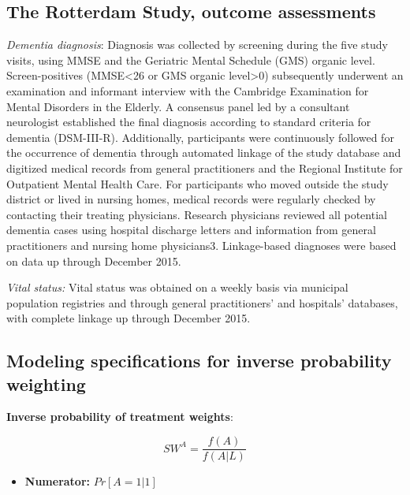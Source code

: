 \documentclass[
]{book}
\providecommand{\tightlist}{%
  \setlength{\itemsep}{0pt}\setlength{\parskip}{0pt}}
\begin{document}
\hypertarget{the-rotterdam-study-outcome-assessments}{%
\subsection{The Rotterdam Study, outcome assessments}\label{the-rotterdam-study-outcome-assessments}}

\emph{Dementia diagnosis}: Diagnosis was collected by screening during the five study visits, using MMSE and the Geriatric Mental Schedule (GMS) organic level. Screen-positives (MMSE\textless26 or GMS organic level\textgreater0) subsequently underwent an examination and informant interview with the Cambridge Examination for Mental Disorders in the Elderly. A consensus panel led by a consultant neurologist established the final diagnosis according to standard criteria for dementia (DSM-III-R). Additionally, participants were continuously followed for the occurrence of dementia through automated linkage of the study database and digitized medical records from general practitioners and the Regional Institute for Outpatient Mental Health Care. For participants who moved outside the study district or lived in nursing homes, medical records were regularly checked by contacting their treating physicians. Research physicians reviewed all potential dementia cases using hospital discharge letters and information from general practitioners and nursing home physicians3. Linkage-based diagnoses were based on data up through December 2015.

\emph{Vital status:} Vital status was obtained on a weekly basis via municipal population registries and through general practitioners' and hospitals' databases, with complete linkage up through December 2015.

\hypertarget{modeling-specifications-for-inverse-probability-weighting}{%
\subsection{Modeling specifications for inverse probability weighting}\label{modeling-specifications-for-inverse-probability-weighting}}

\textbf{Inverse probability of treatment weights}:

\[SW^A = \frac{f(A)}{f(A|L)}\]

\begin{itemize}
\tightlist
\item
  \textbf{Numerator:} \(Pr[A = 1|1]\)
\end{itemize}
\end{document}
